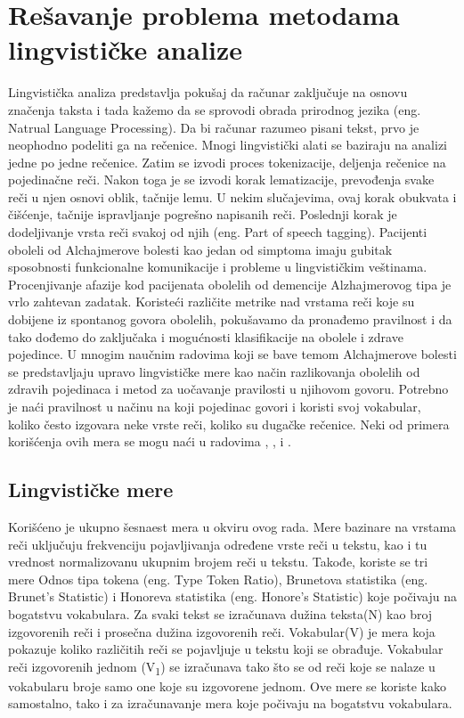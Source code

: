 \documentclass[12pt,oneside]{memoir}
\begin{document}
\chapter{Rešavanje problema metodama lingvističke analize}

Lingvistička analiza predstavlja pokušaj da računar zaključuje na osnovu značenja taksta i tada kažemo da se sprovodi obrada prirodnog jezika (eng. Natrual Language Processing).  Da bi računar razumeo pisani tekst,  prvo je neophodno podeliti ga na rečenice.  Mnogi lingvistički alati se baziraju na analizi jedne po jedne rečenice.  Zatim se izvodi proces tokenizacije,  deljenja rečenice na pojedinačne reči.  Nakon toga je se izvodi korak lematizacije,  prevođenja svake reči u njen osnovi oblik, tačnije lemu.  U nekim slučajevima,  ovaj korak obukvata i čišćenje, tačnije ispravljanje pogrešno napisanih reči.  Poslednji korak je dodeljivanje vrsta reči svakoj od njih (eng. Part of speech tagging). 
Pacijenti oboleli od Alchajmerove bolesti kao jedan od simptoma imaju gubitak sposobnosti funkcionalne komunikacije i probleme u lingvističkim veštinama.  Procenjivanje afazije kod pacijenata obolelih od demencije Alzhajmerovog tipa je vrlo zahtevan zadatak.  Koristeći različite metrike nad vrstama reči koje su dobijene iz spontanog govora obolelih,  pokušavamo da pronađemo pravilnost i da tako dođemo do zaključaka i mogućnosti klasifikacije na obolele i zdrave pojedince.  
U mnogim naučnim radovima koji se bave temom Alchajmerove bolesti se predstavljaju upravo lingvističke mere kao način razlikovanja obolelih od zdravih pojedinaca i metod za uočavanje pravilosti u njihovom govoru. Potrebno je naći pravilnost u načinu na koji pojedinac govori i koristi svoj vokabular, koliko često izgovara neke vrste reči,  koliko su dugačke rečenice.  Neki od primera korišćenja ovih mera se mogu naći u radovima , \cite{automaticdetandrat}, \cite{Evaloftechfolexicalperformance} i \cite{linguisticfeatures}.

\section{Lingvističke mere}

Korišćeno je ukupno šesnaest mera u okviru ovog rada.  Mere bazinare na vrstama reči uključuju frekvenciju pojavljivanja određene vrste reči u tekstu, kao i tu vrednost normalizovanu ukupnim brojem reči u tekstu. Takođe,  koriste se tri mere Odnos tipa tokena (eng.  Type Token Ratio),  Brunetova statistika (eng. Brunet's Statistic) i Honoreva statistika (eng.  Honore's Statistic) koje počivaju na bogatstvu vokabulara. 
Za svaki tekst se izračunava dužina teksta(N) kao broj izgovorenih reči i prosečna dužina izgovorenih reči.  Vokabular(V) je mera koja pokazuje koliko različitih reči se pojavljuje u tekstu koji se obrađuje.  Vokabular reči izgovorenih jednom (V\textsubscript{1}) se izračunava tako što se od reči koje se nalaze u vokabularu broje samo one koje su izgovorene jednom.  Ove mere se koriste kako samostalno, tako i za izračunavanje mera koje počivaju na bogatstvu vokabulara. 
\break
\end{document}
